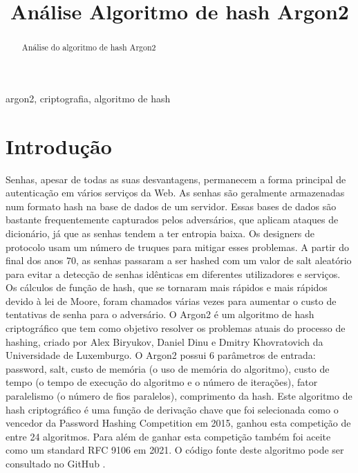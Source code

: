 \documentclass[conference]{IEEEtran}
\begin{document}
\title{Análise Algoritmo de hash Argon2\\
}

\author{
}

\maketitle

\begin{abstract}
Análise do algoritmo de hash Argon2
\end{abstract}

\begin{IEEEkeywords}
argon2, criptografia, algoritmo de hash
\end{IEEEkeywords}

\section{Introdução}
Senhas, apesar de todas as suas desvantagens, permanecem a forma principal de autenticação em vários serviços da Web. 
As senhas são geralmente armazenadas num formato hash na base de dados de um servidor. 
Essas bases de dados são bastante frequentemente capturados pelos adversários, que aplicam ataques de dicionário, 
já que as senhas tendem a ter entropia baixa. Os designers de protocolo usam um número de truques para mitigar esses problemas. 
A partir do final dos anos 70, as senhas passaram a ser hashed com um valor de salt aleatório 
para evitar a detecção de senhas idênticas em diferentes utilizadores e serviços. 
Os cálculos de função de hash, que se tornaram mais rápidos e mais rápidos devido à lei de Moore, 
foram chamados várias vezes para aumentar o custo de tentativas de senha para o adversário. \cite{rfc9106}
O Argon2 é um algoritmo de hash criptográfico que tem como objetivo resolver os problemas atuais do processo de hashing, 
criado por Alex Biryukov, Daniel Dinu e Dmitry Khovratovich da Universidade de Luxemburgo. 
O Argon2 possui 6 parâmetros de entrada: password, salt, custo de memória (o uso de memória do algoritmo), 
custo de tempo (o tempo de execução do algoritmo e o número de iterações), fator paralelismo (o número de fios paralelos), 
comprimento da hash. \cite{rfc9106}
Este algoritmo de hash criptográfico é uma função de derivação chave que foi selecionada como o vencedor da 
Password Hashing Competition \cite{phc} em 2015, ganhou esta competição de entre 24 algoritmos. 
Para além de ganhar esta competição também foi aceite como um standard RFC 9106 \cite{rfc9106} em 2021.
O código fonte deste algoritmo pode ser consultado no GitHub \cite{rfc9106}.
\end{document}
